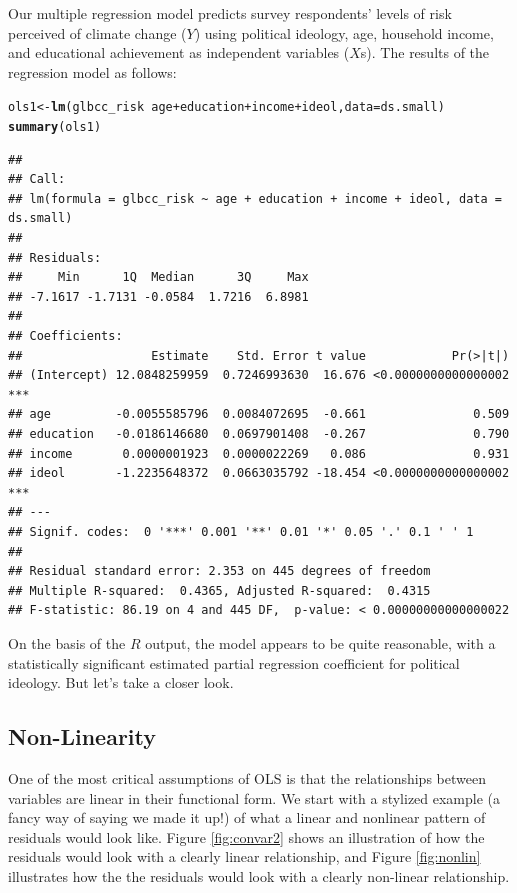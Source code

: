 \documentclass[11pt,openany]{book}\usepackage[]{graphicx}\usepackage[]{color}
\makeatletter
\newcommand{\hlopt}[1]{\textcolor[rgb]{0,0,0}{#1}}%
\newcommand{\hlstd}[1]{\textcolor[rgb]{0.345,0.345,0.345}{#1}}%
\newcommand{\hlkwb}[1]{\textcolor[rgb]{0.69,0.353,0.396}{#1}}%
\newcommand{\hlkwc}[1]{\textcolor[rgb]{0.333,0.667,0.333}{#1}}%
\newcommand{\hlkwd}[1]{\textcolor[rgb]{0.737,0.353,0.396}{\textbf{#1}}}%
\newenvironment{kframe}{%
 \def\at@end@of@kframe{}%
 \ifinner\ifhmode%
  \def\at@end@of@kframe{\end{minipage}}%
  \begin{minipage}{\columnwidth}%
 \fi\fi%
 \def\FrameCommand##1{\hskip\@totalleftmargin \hskip-\fboxsep
 \colorbox{shadecolor}{##1}\hskip-\fboxsep
     \hskip-\linewidth \hskip-\@totalleftmargin \hskip\columnwidth}%
 \MakeFramed {\advance\hsize-\width
   \@totalleftmargin\z@ \linewidth\hsize
   \@setminipage}}%
 {\par\unskip\endMakeFramed%
 \at@end@of@kframe}
\newenvironment{knitrout}{}{} %
\renewenvironment{knitrout}{\begin{singlespace}}{\end{singlespace}}
\makeatother
\begin{document}
Our multiple regression model predicts survey respondents' levels of risk perceived of climate change ($Y$) using political ideology, age, household income,  and educational achievement as independent variables ($X$s). The results of the regression model as follows:

\begin{knitrout}
\color{fgcolor}\begin{kframe}
\begin{alltt}
\hlstd{ols1} \hlkwb{<-} \hlkwd{lm}\hlstd{(glbcc_risk} \hlopt{~} \hlstd{age} \hlopt{+} \hlstd{education} \hlopt{+} \hlstd{income} \hlopt{+} \hlstd{ideol,} \hlkwc{data} \hlstd{= ds.small)}
\hlkwd{summary}\hlstd{(ols1)}
\end{alltt}
\begin{verbatim}
## 
## Call:
## lm(formula = glbcc_risk ~ age + education + income + ideol, data = ds.small)
## 
## Residuals:
##     Min      1Q  Median      3Q     Max 
## -7.1617 -1.7131 -0.0584  1.7216  6.8981 
## 
## Coefficients:
##                  Estimate    Std. Error t value            Pr(>|t|)    
## (Intercept) 12.0848259959  0.7246993630  16.676 <0.0000000000000002 ***
## age         -0.0055585796  0.0084072695  -0.661               0.509    
## education   -0.0186146680  0.0697901408  -0.267               0.790    
## income       0.0000001923  0.0000022269   0.086               0.931    
## ideol       -1.2235648372  0.0663035792 -18.454 <0.0000000000000002 ***
## ---
## Signif. codes:  0 '***' 0.001 '**' 0.01 '*' 0.05 '.' 0.1 ' ' 1
## 
## Residual standard error: 2.353 on 445 degrees of freedom
## Multiple R-squared:  0.4365,	Adjusted R-squared:  0.4315 
## F-statistic: 86.19 on 4 and 445 DF,  p-value: < 0.00000000000000022
\end{verbatim}
\end{kframe}
\end{knitrout}

On the basis of the $R$ output, the model appears to be quite reasonable, with a statistically significant estimated partial regression coefficient for political ideology. But let's take a closer look.

\subsection{Non-Linearity} 

One of the most critical assumptions of OLS is that the relationships between variables are linear in their functional form. We start with a stylized example (a fancy way of saying we made it up!) of what a linear and nonlinear pattern of residuals would look like. Figure \ref{fig:convar2} shows an illustration of how the residuals would look with a clearly linear relationship, and Figure \ref{fig:nonlin} illustrates how the the residuals would look with a clearly non-linear relationship.  
\end{document}
